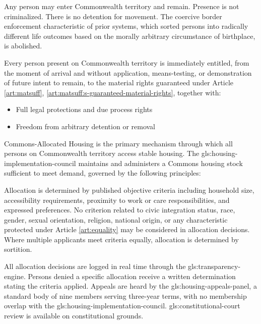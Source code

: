 


Any person may enter Commonwealth territory and remain. Presence is not criminalized. There is no detention for movement. The coercive border enforcement characteristic of prior systems, which sorted persons into radically different life outcomes based on the morally arbitrary circumstance of birthplace, is abolished.

Every person present on Commonwealth territory is immediately entitled, from the moment of arrival and without application, means-testing, or demonstration of future intent to remain, to the material rights guaranteed under Article \ref{art:matsuff}, \ref{art:matsuff:s-guaranteed-material-rights}, together with:
\begin{itemize}
  \item Full legal protections and due process rights
  \item Freedom from arbitrary detention or removal
\end{itemize}

Commons-Allocated Housing is the primary mechanism through which all persons on Commonwealth territory access stable housing. The \gls{gls:housing-implementation-council} maintains and administers a Commons housing stock sufficient to meet demand, governed by the following principles:

Allocation is determined by published objective criteria including household size, accessibility requirements, proximity to work or care responsibilities, and expressed preferences. No criterion related to civic integration status, race, gender, sexual orientation, religion, national origin, or any characteristic protected under Article \ref{art:equality} may be considered in allocation decisions. Where multiple applicants meet criteria equally, allocation is determined by sortition.

All allocation decisions are logged in real time through the \gls{gls:transparency-engine}. Persons denied a specific allocation receive a written determination stating the criteria applied. Appeals are heard by the \gls{gls:housing-appeals-panel}, a standard body of nine members serving three-year terms, with no membership overlap with the \gls{gls:housing-implementation-council}. \gls{gls:constitutional-court} review is available on constitutional grounds.

